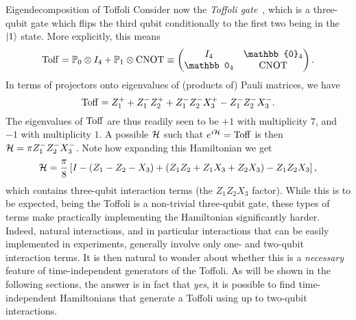 \begin{examplebox}[label={ex:GL:eigendecomposition_Toffoli}]{Eigendecomposition of Toffoli}
Consider now the \emph{Toffoli gate}~\cite{shi2002both,lanyon2008simplifying,monz2009realization,fedorov2011implementation,shi2018deutsch}, which is a three-qubit gate which flips the third qubit conditionally to the first two being in the $\ket1$ state.
More explicitly, this means
\begin{equation}
    \Toff =
    \PP_0\otimes I_4 + \PP_1\otimes\CNOT
    \equiv
    \begin{pmatrix}
        I_4 & \mathbb{0}_4 \\
        \mathbb 0_4 & \CNOT
    \end{pmatrix}.
\end{equation}
In terms of projectors onto eigenvalues of (products of) Pauli matrices, we have
\begin{equation}
    \operatorname{Toff} = Z_1^+ + Z_1^- Z_2^+ + Z_1^- Z_2^- X_3^+ - Z_1^- Z_2^- X_3^-.
\end{equation}
The eigenvalues of $\operatorname{Toff}$ are thus readily seen to be $+1$ with multiplicity $7$, and $-1$ with multiplicity $1$.
A possible ${\mathcal{H}}$ such that $e^{i{\mathcal{H}}}=\operatorname{Toff}$ is then ${\mathcal{H}}=\pi Z_1^- Z_2^- X_3^-$.
Note how expanding this Hamiltonian we get
\begin{equation}
    {\mathcal{H}} = \frac{\pi}{8}\left[
        I - (Z_1 - Z_2 - X_3)
        + (Z_1 Z_2 + Z_1 X_3 + Z_2 X_3)
        - Z_1 Z_2 X_3
    \right],
\end{equation}
which contains three-qubit interaction terms (the $Z_1 Z_2 X_3$ factor). While this is to be expected, being the Toffoli is a non-trivial three-qubit gate, these types of terms make practically implementing the Hamiltonian significantly harder.
Indeed, natural interactions, and in particular interactions that can be easily implemented in experiments, generally involve only one- and two-qubit interaction terms.
It is then natural to wonder about whether this is a \emph{necessary} feature of time-independent generators of the Toffoli.
As will be shown in the following sections, the answer is in fact that \emph{yes}, it is possible to find time-independent Hamiltonians that generate a Toffoli using up to two-qubit interactions.
\end{examplebox}

